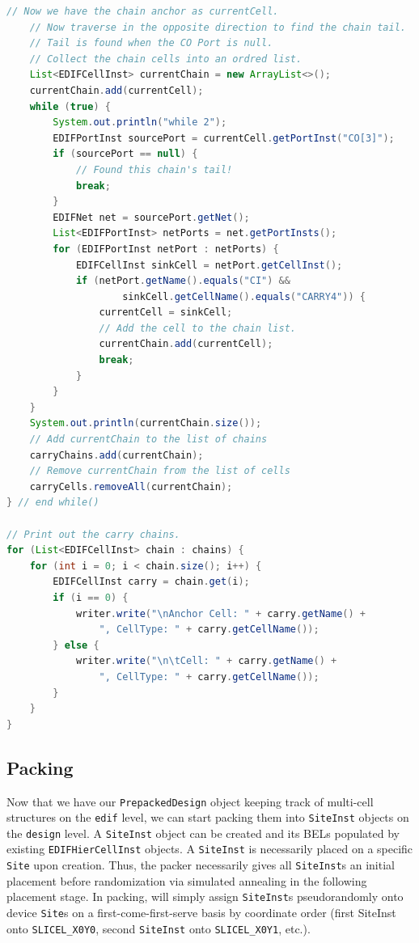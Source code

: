 \begin{multicols}{2}
\begin{lstlisting}[language=java, caption={Finding and storing carry chains.}, label={lst:carry_chains}]
    // Now we have the chain anchor as currentCell.
    // Now traverse in the opposite direction to find the chain tail.
    // Tail is found when the CO Port is null.
    // Collect the chain cells into an ordred list.
    List<EDIFCellInst> currentChain = new ArrayList<>();
    currentChain.add(currentCell);
    while (true) {
        System.out.println("while 2");
        EDIFPortInst sourcePort = currentCell.getPortInst("CO[3]");
        if (sourcePort == null) {
            // Found this chain's tail!
            break;
        }
        EDIFNet net = sourcePort.getNet();
        List<EDIFPortInst> netPorts = net.getPortInsts();
        for (EDIFPortInst netPort : netPorts) {
            EDIFCellInst sinkCell = netPort.getCellInst();
            if (netPort.getName().equals("CI") &&
                    sinkCell.getCellName().equals("CARRY4")) {
                currentCell = sinkCell;
                // Add the cell to the chain list.
                currentChain.add(currentCell);
                break;
            }
        }
    }
    System.out.println(currentChain.size());
    // Add currentChain to the list of chains
    carryChains.add(currentChain);
    // Remove currentChain from the list of cells
    carryCells.removeAll(currentChain);
} // end while()

// Print out the carry chains. 
for (List<EDIFCellInst> chain : chains) {
    for (int i = 0; i < chain.size(); i++) {
        EDIFCellInst carry = chain.get(i);
        if (i == 0) {
            writer.write("\nAnchor Cell: " + carry.getName() + 
                ", CellType: " + carry.getCellName());
        } else {
            writer.write("\n\tCell: " + carry.getName() + 
                ", CellType: " + carry.getCellName());
        }
    }
}
\end{lstlisting}




\subsection{Packing}
\label{subsec:packing}
Now that we have our \texttt{PrepackedDesign} object keeping track of multi-cell structures on the \texttt{edif} level, we can start packing them into \texttt{SiteInst} objects on the \texttt{design} level. 
A \texttt{SiteInst} object can be created and its BELs populated by existing \texttt{EDIFHierCellInst} objects. 
A \texttt{SiteInst} is necessarily placed on a specific \texttt{Site} upon creation. 
Thus, the packer necessarily gives all \texttt{SiteInst}s an initial placement before randomization via simulated annealing in the following placement stage. 
In packing, will simply assign \texttt{SiteInst}s pseudorandomly onto device \texttt{Site}s on a first-come-first-serve basis by coordinate order (first SiteInst onto \texttt{SLICEL\_X0Y0}, second \texttt{SiteInst} onto \texttt{SLICEL\_X0Y1}, etc.). 


\end{multicols}

